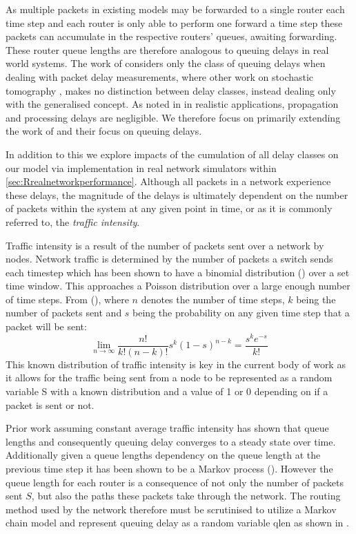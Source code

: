 As multiple packets in existing models may be forwarded to a single router each time step and each router is only able to perform one forward a time step these packets can accumulate in the respective routers’ queues, awaiting forwarding. These router queue lengths are therefore analogous to queuing delays in real world systems. The work of \cite{barnes_stochastic_2020} considers only the class of queuing delays when dealing with packet delay measurements, where other work on stochastic tomography \cite{kolar_distributed_2020}, \cite{he_fisher_2015} makes no distinction between delay classes, instead dealing only with the generalised concept. As noted in \cite{telchemy_impact_2006} in realistic applications, propagation and processing delays are negligible. We therefore focus on primarily extending the work of \cite{barnes_stochastic_2020} and their focus on queuing delays.\par
In addition to this we explore impacts of the cumulation of all delay classes on our model via implementation in real network simulators within \cref{sec:Rrealnetworkperformance}. Although all packets in a network experience these delays, the magnitude of the delays is ultimately dependent on the number of packets within the system at any given point in time, or as it is commonly referred to, the \textit{traffic intensity}.\par
Traffic intensity is a result of the number of packets sent over a network by nodes. Network traffic is determined by the number of packets a switch sends each timestep which has been shown to have a binomial distribution (\cite{barnes_stochastic_2020}) over a set time window. This approaches a Poisson distribution over a large enough number of time steps. From (\cite{barnes_stochastic_2020}), where $n$ denotes the number of time steps, $k$ being the number of packets sent and $s$ being the probability on any given time step that a packet will be sent:
\[\lim_{n\to\infty} \frac{n!}{k!(n-k)!}s^k (1-s)^{n-k} =\frac{s^k e^{-s}}{k!}\]
This known distribution of traffic intensity is key in the current body of work as it allows for the traffic being sent from a node to be represented as a random variable S with a known distribution and a value of 1 or 0 depending on if a packet is sent or not. \par
Prior work assuming constant average traffic intensity has shown that queue lengths and consequently queuing delay converges to a steady state over time. Additionally given a queue lengths dependency on the queue length at the previous time step it has been shown to be a Markov process (\cite{barnes_stochastic_2020}). However the queue length for each router is a consequence of not only the number of packets sent $S$, but also the paths these packets take through the network. The routing method used by the network therefore must be scrutinised to utilize a Markov chain model and represent queuing delay as a random variable \gls{qlen} as shown in \cite{barnes_stochastic_2020}.\par
